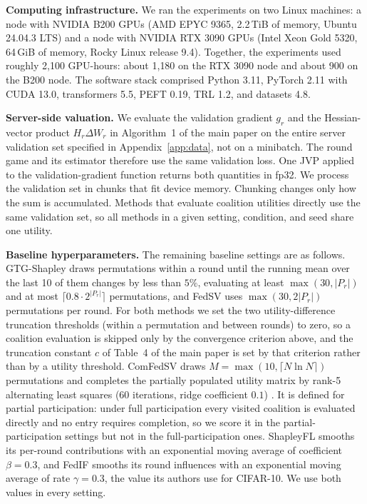 \documentclass[letterpaper]{article} %
\theoremstyle{definition}
\begin{document}
\noindent\textbf{Computing infrastructure.} We ran the experiments on two Linux
machines: a node with NVIDIA B200 GPUs (AMD EPYC 9365, 2.2\,TiB of memory,
Ubuntu 24.04.3 LTS) and a node with NVIDIA RTX 3090 GPUs (Intel Xeon Gold
5320, 64\,GiB of memory, Rocky Linux release 9.4). Together, the experiments
used roughly 2{,}100 GPU-hours: about 1{,}180 on the RTX 3090 node and about
900 on the B200 node. The software stack comprised Python 3.11, PyTorch 2.11
with CUDA 13.0, transformers 5.5, PEFT 0.19, TRL 1.2, and datasets 4.8.

\noindent\textbf{Server-side valuation.} We evaluate the validation gradient $g_r$ and
the Hessian-vector product $H_r \Delta W_r$ in Algorithm~1 of the main paper on
the entire server validation set specified in Appendix~\ref{app:data}, not on a
minibatch. The round game and its estimator therefore use the same validation
loss. One JVP applied to the validation-gradient function returns both
quantities in fp32. We process the validation set in chunks that fit device
memory. Chunking changes only how the sum is accumulated. Methods that
evaluate coalition utilities directly use the same validation set, so all
methods in a given setting, condition, and seed share one utility.

\noindent\textbf{Baseline hyperparameters.} The remaining baseline settings are as
follows. GTG-Shapley \citep{liu2022gtg} draws permutations within a round
until the running mean over the last 10 of them changes by less than $5\%$,
evaluating at least $\max(30, |P_r|)$ and at most
$\lceil 0.8 \cdot 2^{|P_r|} \rceil$ permutations, and FedSV uses
$\max(30, 2|P_r|)$ permutations per round. For both methods we set the two
utility-difference truncation thresholds (within a permutation and between
rounds) to zero, so a coalition evaluation is skipped only by the convergence
criterion above, and the truncation constant $c$ of Table~4 of the main paper
is set by that criterion rather than by a utility threshold. ComFedSV draws
$M = \max(10, \lceil N \ln N \rceil)$ permutations and completes the partially
populated utility matrix by rank-5 alternating least squares (60 iterations,
ridge coefficient $0.1$) \citep{fan2022improving}. It is defined for partial
participation: under full participation every visited coalition is evaluated
directly and no entry requires completion, so we score it in the
partial-participation settings but not in the full-participation ones.
ShapleyFL \citep{sun2023shapleyfl} smooths its per-round contributions with an
exponential moving average of coefficient $\beta{=}0.3$, and FedIF
\citep{tang2025lightweight} smooths its round influences with an exponential
moving average of rate $\gamma{=}0.3$, the value its authors use for CIFAR-10.
We use both values in every setting.
\end{document}
